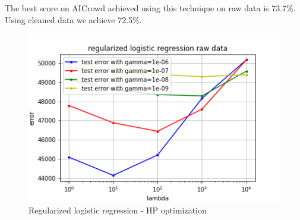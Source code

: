 \documentclass[11pt, a4paper, twocolumn]{article}
\begin{document}
The best score on AICrowd achieved using this technique on raw data is 73.7\%. Using cleaned data we achieve 72.5\%.
\begin{figure}[h!]
  \includegraphics[width=\linewidth]{plots/raw_data_reg_log_regr.png}
  \caption{Regularized logistic regression - HP optimization}
  \label{fig:raw_reg_log_regr}
\end{figure}
\end{document}
